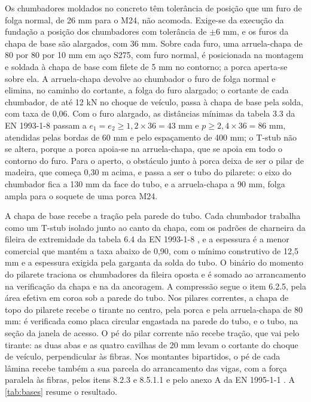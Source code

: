 Os chumbadores moldados no concreto têm tolerância de posição que um furo de
folga normal, de 26 mm para o M24, não acomoda. Exige-se da execução da fundação
a posição dos chumbadores com tolerância de $\pm 6$ mm, e os furos da chapa de
base são alargados, com 36 mm. Sobre cada furo, uma arruela-chapa de 80 por
80 por 10 mm em aço S275, com furo normal, é posicionada na montagem e soldada à
chapa de base com filete de 5 mm no contorno; a porca aperta-se sobre ela. A
arruela-chapa devolve ao chumbador o furo de folga normal e elimina, no caminho
do cortante, a folga do furo alargado; o cortante de cada chumbador, de até
12 kN no choque de veículo, passa à chapa de base pela solda, com taxa de 0,06.
Com o furo alargado, as distâncias mínimas da tabela 3.3 da EN 1993-1-8 passam
a $e_1 = e_2 \geq 1{,}2 \times 36 = 43$ mm e $p \geq 2{,}4 \times 36 = 86$ mm,
atendidas pelas bordas de 60 mm e pelo espaçamento de 400 mm; o T-stub não se
altera, porque a porca apoia-se na arruela-chapa, que se apoia em todo o
contorno do furo. Para o aperto, o obstáculo junto à porca deixa de ser o pilar
de madeira, que começa 0,30 m acima, e passa a ser o tubo do pilarete: o eixo
do chumbador fica a 130 mm da face do tubo, e a arruela-chapa a 90 mm, folga
ampla para o soquete de uma porca M24.

A chapa de base recebe a tração pela parede do tubo. Cada chumbador trabalha como
um T-stub isolado junto ao canto da chapa, com os padrões de charneira da
fileira de extremidade da tabela 6.4 da EN 1993-1-8 \cite{EN1993-1-8:2005}, e a
espessura é a menor comercial que mantém a taxa abaixo de 0,90, com o mínimo
construtivo de 12,5 mm e a espessura exigida pela garganta da solda do tubo. O
binário do momento do pilarete traciona os chumbadores da fileira oposta e é
somado ao arrancamento na verificação da chapa e na da ancoragem. A compressão
segue o item 6.2.5, pela área efetiva em coroa sob a parede do tubo. Nos pilares
correntes, a chapa de topo do pilarete recebe o tirante no centro, pela porca e
pela arruela-chapa de 80 mm: é verificada como placa circular engastada na parede
do tubo, e o tubo, na seção da janela de acesso. O pé do pilar corrente não
recebe tração, que vai pelo tirante: as duas abas e as quatro cavilhas de 20 mm
levam o cortante do choque de veículo, perpendicular às fibras. Nos montantes
bipartidos, o pé de cada lâmina recebe também a sua parcela do arrancamento das
vigas, com a força paralela às fibras, pelos itens 8.2.3 e 8.5.1.1 e pelo anexo A
da EN 1995-1-1 \cite{EN1995-1-1:2004}. A \autoref{tab:bases} resume o resultado.

